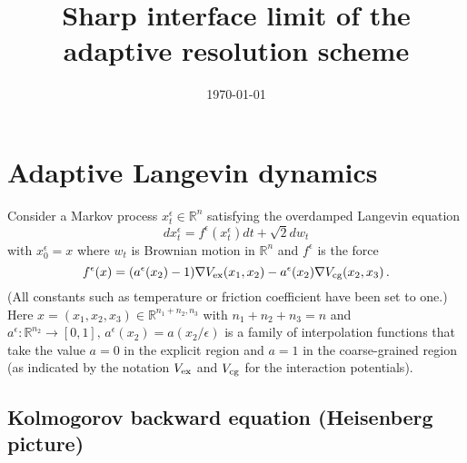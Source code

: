 \documentclass{amsart}
\title{Sharp interface limit of the adaptive resolution scheme}
\date{\today}
\newcommand{\R}{{\mathbb R}}
\newcommand{\eps}{\epsilon}
\begin{document}
\maketitle
\section{Adaptive Langevin dynamics}

Consider a Markov process $x^{\eps}_{t}\in \R^{n}$ satisfying the overdamped Langevin equation 
\begin{equation}\label{lang}
dx^{\eps}_{t}  = f^{\eps}(x^{\eps}_{t})dt + \sqrt{2} dw_{t} 
\end{equation}
with $x^{\eps}_{0}=x$ where $w_{t}$ is Brownian motion in $\R^{n}$ and $f^{\eps}$ is the force
 \begin{equation}\label{force}
f^{\eps}(x) = (a^{\eps}(x_{2})-1)\nabla V_{\rm ex}(x_{1},x_{2}) - a^{\eps}(x_{2})\nabla V_{\rm cg}(x_{2},x_{3})\,.
\end{equation}
(All constants such as temperature or friction coefficient have been set to one.) 
Here $x=(x_{1},x_{2},x_{3})\in\R^{n_{1}+n_{2},n_{3}}$ with $n_{1}+n_{2}+n_{3}=n$ and $a^{\eps}\colon\R^{n_{2}}\to[0,1],\, a^{\eps}(x_{2})=a(x_{2}/\eps)$ is a family of interpolation functions that take the value $a=0$ in the explicit region and $a=1$ in the coarse-grained region (as indicated by the notation $V_{\rm ex}$ and $V_{\rm cg}$ for the interaction potentials). 


\subsection{Kolmogorov backward equation (Heisenberg picture)}
 
\end{document}
